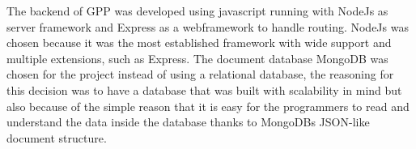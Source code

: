 The backend of GPP was developed using javascript running with NodeJs as server framework and Express as a webframework to handle routing. NodeJs was chosen because
it was the most established framework with wide support and multiple extensions, such as Express.
The document database MongoDB was chosen for the project instead of using a relational database, the reasoning for this decision was to have a database that was built with scalability in mind but also because of the simple reason that it is easy for the programmers to read and understand the data inside the database thanks to MongoDBs JSON-like document structure.


